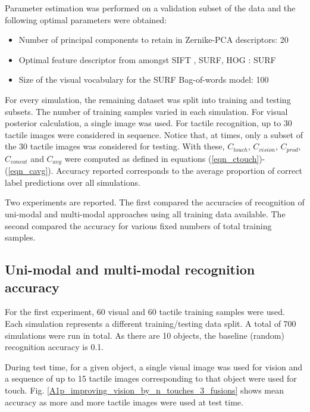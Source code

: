 \documentclass[9pt,technote]{IEEEtran}  %
\begin{document}
\begin{figure}[b]
	\centering
\end{figure}
	
Parameter estimation was performed on a validation subset of the data and the following optimal parameters were obtained:
\begin{itemize}
	\item Number of principal components to retain in Zernike-PCA descriptors: 20
	\item Optimal feature descriptor from amongst SIFT \cite{Lowe1999}, SURF, HOG \cite{Dalal2005}: SURF
	\item Size of the visual vocabulary for the SURF Bag-of-words model: 100
\end{itemize}
For every simulation, the remaining dataset was split into training and testing subsets. The number of training samples varied in each simulation. For visual posterior calculation, a single image was used. For tactile recognition, up to 30 tactile images were considered in sequence. Notice that, at times, only a subset of the 30 tactile images was considered for testing. With these, $C_{touch}$, $C_{vision}$, $C_{prod}$, $C_{concat}$ and $C_{avg}$ were computed as defined in equations (\ref{eqn_ctouch})-(\ref{eqn_cavg}). Accuracy reported corresponds to the average proportion of correct label predictions over all simulations.

Two experiments are reported. The first compared the accuracies of recognition of uni-modal and multi-modal approaches using all training data available. The second compared the accuracy for various fixed numbers of total training samples.

\subsection{Uni-modal and multi-modal recognition accuracy}
For the first experiment, 60 visual and 60 tactile training samples were used. Each simulation represents a different training/testing data split. A total of 700 simulations were run in total. As there are 10 objects, the baseline (random) recognition accuracy is 0.1.

During test time, for a given object, a single visual image was used for vision and a sequence of up to 15 tactile images corresponding to that object were used for touch. Fig. \ref{A1p_improving_vision_by_n_touches_3_fusions} shows mean accuracy as more and more tactile images were used at test time. 
\end{document}

